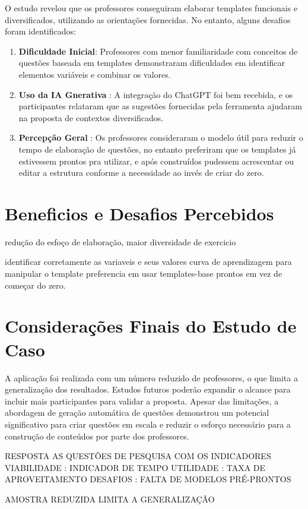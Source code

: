 O estudo revelou que os professores conseguiram elaborar templates funcionais e diversificados, utilizando as orientações fornecidas. No entanto, alguns desafios foram identificados:

\begin{enumerate}
    \item \textbf{Dificuldade Inicial}: Professores com menor familiaridade com conceitos de questões baseada em templates demonstraram dificuldades em identificar elementos variáveis e combinar os valores.
    \item \textbf{Uso da IA Gnerativa} : A integração do ChatGPT foi bem recebida, e os participantes relataram que as sugestões fornecidas pela ferramenta ajudaram na proposta de contextos diversificados.
    \item \textbf{Percepção Geral} : Os professores consideraram o modelo útil para reduzir o tempo de elaboração de questões, no entanto preferiram que os templates já estivessem prontos pra utilizar, e após construídos pudessem acrescentar ou editar a estrutura conforme a necessidade ao invés de criar do zero.
\end{enumerate}


\section{Beneficios e Desafios Percebidos}

redução do esfoço de elaboração, maior diversidade de exercicio

identificar corretamente as variaveis e seus valores
curva de aprendizagem para manipular o template
preferencia em usar templates-base prontos em vez de começar do zero.

\section{Considerações Finais do Estudo de Caso}
A aplicação foi realizada com um número reduzido de professores, o que limita a generalização dos resultados. Estudos futuros poderão expandir o alcance para incluir mais participantes para validar a proposta. Apesar das limitações, a abordagem de geração automática de questões demonstrou um potencial significativo para criar questões em escala e reduzir o esforço necessário para a construção de conteúdos por parte dos professores.


RESPOSTA AS QUESTÕES DE PESQUISA COM OS INDICADORES 
VIABILIDADE : INDICADOR DE TEMPO
UTILIDADE : TAXA DE APROVEITAMENTO 
DESAFIOS : FALTA DE MODELOS PRÉ-PRONTOS

AMOSTRA REDUZIDA LIMITA A GENERALIZAÇÃO



